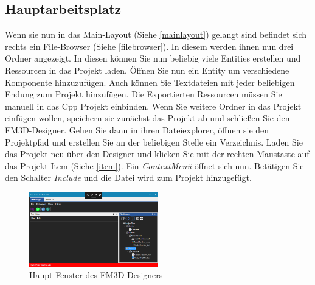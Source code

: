 \subsection{Hauptarbeitsplatz}
Wenn sie nun in das Main-Layout (Siehe \cref{mainlayout}) gelangt sind befindet sich rechts ein File-Browser (Siehe \cref{filebrowser}). In diesem werden ihnen nun drei Ordner angezeigt. In diesen können Sie nun beliebig viele Entities erstellen und Ressourcen in das Projekt laden. Öffnen Sie nun ein Entity um verschiedene Komponente hinzuzufügen.
Auch können Sie Textdateien mit jeder beliebigen Endung zum Projekt hinzufügen.
Die Exportierten Ressourcen müssen Sie manuell in das Cpp Projekt einbinden.
Wenn Sie weitere Ordner in das Projekt einfügen wollen, speichern sie zunächst das Projekt ab und schließen Sie den FM3D-Designer. Gehen Sie dann in ihren Dateiexplorer, öffnen sie den Projektpfad und erstellen Sie an der beliebigen Stelle ein Verzeichnis. Laden Sie das Projekt neu über den Designer und klicken Sie mit der rechten Maustaste auf das Projekt-Item (Siehe \cref{item}). Ein \textit{ContextMenü} öffnet sich nun. Betätigen Sie den Schalter \textit{Include} und die Datei wird zum Projekt hinzugefügt.
\begin{figure}
	\begin{center}
		\includegraphics[width=0.5\textwidth]{04verwendung/Designer/01workstation.PNG}
		\caption{Haupt-Fenster des FM3D-Designers}\label{arbeitsplatz}
	\end{center}
\end{figure}

